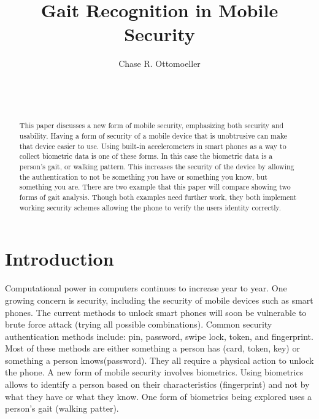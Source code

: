 \documentclass{sig-alternate}
\begin{document}

\title{Gait Recognition in Mobile Security}


\author{
\alignauthor
Chase R. Ottomoeller\\
	\\
	\\
	\\
}

\maketitle



\begin{abstract}
This paper discusses a new form of mobile security, emphasizing both security and usability. Having a form of security of a mobile device that is unobtrusive can make that device easier to use. Using built-in accelerometers in smart phones as a way to collect biometric data is one of these forms. In this case the biometric data is a person's gait, or walking pattern. This increases the security of the device by allowing the authentication to not be something you have or something you know, but something you are. There are two example that this paper will compare showing two forms of gait analysis. Though both examples need further work, they both implement working security schemes allowing the phone to  verify the users identity correctly.  
\end{abstract}




\section{Introduction}
	Computational power in computers continues to increase year to year. One growing concern is security, including the security of mobile devices such as smart phones. The current methods to unlock smart phones will soon be vulnerable to brute force  attack (trying all possible combinations). Common security authentication methods include: pin, password, swipe lock, token, and fingerprint. Most of these methods are either something a person has (card, token, key) or something a person knows(password). They all require a physical action to unlock the phone. A new form of mobile security involves biometrics. Using biometrics allows to identify a person based on their characteristics (fingerprint) and not by what they have or what they know.  One form of biometrics being explored uses a person's gait (walking patter). 
	
\end{document}
